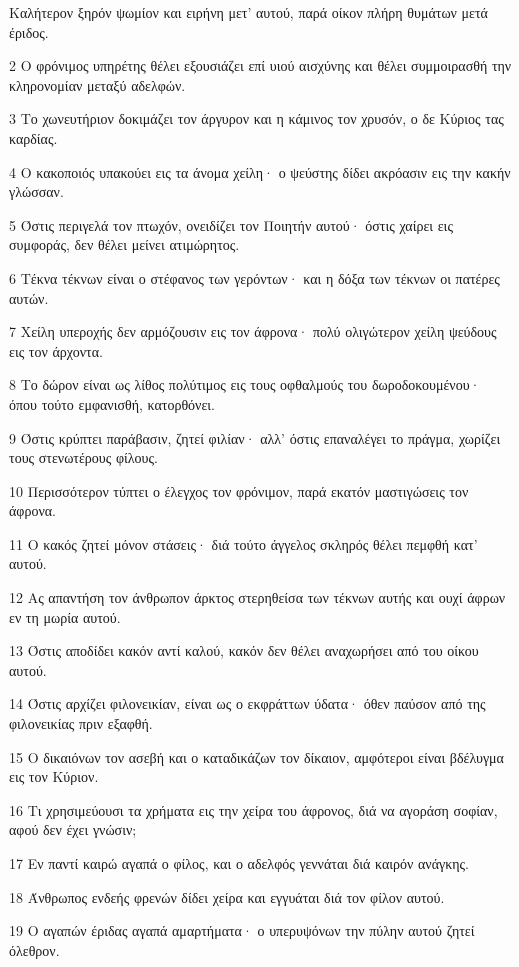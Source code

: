 \par Καλήτερον ξηρόν ψωμίον και ειρήνη μετ' αυτού, παρά οίκον πλήρη θυμάτων μετά έριδος.
\par 2 Ο φρόνιμος υπηρέτης θέλει εξουσιάζει επί υιού αισχύνης και θέλει συμμοιρασθή την κληρονομίαν μεταξύ αδελφών.
\par 3 Το χωνευτήριον δοκιμάζει τον άργυρον και η κάμινος τον χρυσόν, ο δε Κύριος τας καρδίας.
\par 4 Ο κακοποιός υπακούει εις τα άνομα χείλη· ο ψεύστης δίδει ακρόασιν εις την κακήν γλώσσαν.
\par 5 Όστις περιγελά τον πτωχόν, ονειδίζει τον Ποιητήν αυτού· όστις χαίρει εις συμφοράς, δεν θέλει μείνει ατιμώρητος.
\par 6 Τέκνα τέκνων είναι ο στέφανος των γερόντων· και η δόξα των τέκνων οι πατέρες αυτών.
\par 7 Χείλη υπεροχής δεν αρμόζουσιν εις τον άφρονα· πολύ ολιγώτερον χείλη ψεύδους εις τον άρχοντα.
\par 8 Το δώρον είναι ως λίθος πολύτιμος εις τους οφθαλμούς του δωροδοκουμένου· όπου τούτο εμφανισθή, κατορθόνει.
\par 9 Όστις κρύπτει παράβασιν, ζητεί φιλίαν· αλλ' όστις επαναλέγει το πράγμα, χωρίζει τους στενωτέρους φίλους.
\par 10 Περισσότερον τύπτει ο έλεγχος τον φρόνιμον, παρά εκατόν μαστιγώσεις τον άφρονα.
\par 11 Ο κακός ζητεί μόνον στάσεις· διά τούτο άγγελος σκληρός θέλει πεμφθή κατ' αυτού.
\par 12 Ας απαντήση τον άνθρωπον άρκτος στερηθείσα των τέκνων αυτής και ουχί άφρων εν τη μωρία αυτού.
\par 13 Όστις αποδίδει κακόν αντί καλού, κακόν δεν θέλει αναχωρήσει από του οίκου αυτού.
\par 14 Όστις αρχίζει φιλονεικίαν, είναι ως ο εκφράττων ύδατα· όθεν παύσον από της φιλονεικίας πριν εξαφθή.
\par 15 Ο δικαιόνων τον ασεβή και ο καταδικάζων τον δίκαιον, αμφότεροι είναι βδέλυγμα εις τον Κύριον.
\par 16 Τι χρησιμεύουσι τα χρήματα εις την χείρα του άφρονος, διά να αγοράση σοφίαν, αφού δεν έχει γνώσιν;
\par 17 Εν παντί καιρώ αγαπά ο φίλος, και ο αδελφός γεννάται διά καιρόν ανάγκης.
\par 18 Άνθρωπος ενδεής φρενών δίδει χείρα και εγγυάται διά τον φίλον αυτού.
\par 19 Ο αγαπών έριδας αγαπά αμαρτήματα· ο υπερυψόνων την πύλην αυτού ζητεί όλεθρον.
